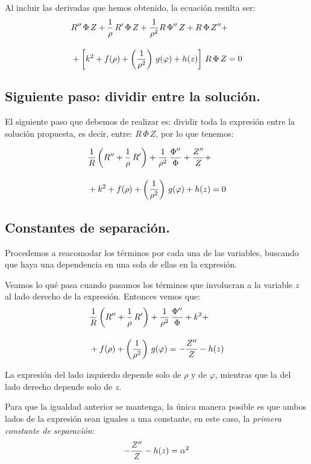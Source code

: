 Al incluir las derivadas que hemos obtenido, la ecuación resulta ser:
\begin{align*}
&{} {R}^{\prime \prime} \, \Phi \, Z + \dfrac{1}{\rho} \, {R}^{\prime} \, \Phi \, Z + \dfrac{1}{\rho^{2}} R \, {\Phi}^{\prime \prime} \, Z + R \, \Phi \, {Z}^{\prime \prime} + \\[1em]
&+ \left[ k^{2} + f(\rho) + \left( \dfrac{1}{\rho^{2}} \right) \, g(\varphi) + h(z) \right] \, R \, \Phi \, Z = 0
\end{align*}

\subsection{Siguiente paso: dividir entre la solución.}

El siguiente paso que debemos de realizar es: dividir toda la expresión entre la solución propuesta, es decir, entre: $R \, \Phi \, Z$, por lo que tenemos:

\begin{align*}
&{} \dfrac{1}{R} \left( {R}^{\prime \prime} + \dfrac{1}{\rho} \, {R}^{\prime} \right) + \dfrac{1}{\rho^{2}} \, \dfrac{{\Phi}^{\prime \prime}}{\Phi} + \dfrac{{Z}^{\prime \prime}}{Z} + \\[1em]
&+ k^{2} + f(\rho) + \left( \dfrac{1}{\rho^{2}} \right) \, g(\varphi) + h(z) = 0    
\end{align*}

\subsection{Constantes de separación.}

Procedemos a reacomodar los términos por cada una de las variables, buscando que haya una dependencia en una sola de ellas en la expresión.
\par
Veamos lo qué pasa cuando pasamos los términos que involucran a la variable $z$ al lado derecho de la expresión. Entonces vemos que:
\begin{align*}
&{} \dfrac{1}{R} \left( {R}^{\prime \prime} + \dfrac{1}{\rho} \, {R}^{\prime} \right) + \dfrac{1}{\rho^{2}} \, \dfrac{{\Phi}^{\prime \prime}}{\Phi} + k^{2} + \\[1em]
&+ f(\rho) + \left( \dfrac{1}{\rho^{2}} \right) \, g(\varphi) = - \dfrac{{Z}^{\prime \prime}}{Z} - h(z)
\end{align*}

La expresión del lado izquierdo depende solo de $\rho$ y de $\varphi$, mientras que la del lado derecho depende solo de $z$.
\par
Para que la igualdad anterior se mantenga, la única manera posible es que ambos lados de la expresión sean iguales a una constante, en este caso, la \emph{primera constante de separación}:
\begin{align*}
- \dfrac{{Z}^{\prime \prime}}{Z} - h(z) = \alpha^{2}
\end{align*}

